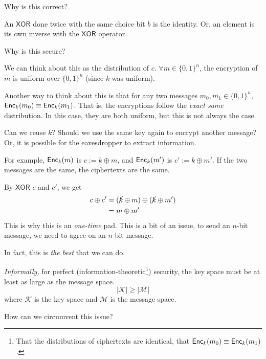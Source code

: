 \begin{ques*}
    Why is this correct?
\end{ques*}
An $\mathsf{XOR}$ done twice with the same choice bit $b$ is the identity. Or, an element is its own inverse with the $\mathsf{XOR}$ operator.

\begin{ques*}
    Why is this secure?
\end{ques*}

We can think about this as the distribution of $c$. $\forall m\in \{0, 1\}^n$, the encryption of $m$ is uniform over $\{0, 1\}^n$ (since $k$ was uniform).

Another way to think about this is that for any two messages $m_0, m_1\in\{0, 1\}^n$, $\operatorname{\mathsf{Enc}}_k(m_0)\equiv \operatorname{\mathsf{Enc}}_k(m_1)$. That is, the encryptions follow the \emph{exact same} distribution. In this case, they are both uniform, but this is not always the case.

\begin{ques*}
    Can we reuse $k$? Should we use the same key again to encrypt another message? Or, it is possible for the eavesdropper to extract information.
\end{ques*}

For example, $\operatorname{\mathsf{Enc}}_k(m)$ is $c:= k\oplus m$, and $\operatorname{\mathsf{Enc}}_k(m')$ is $c' := k\oplus m'$. If the two messages are the same, the ciphertexts are the same.

By $\mathsf{XOR}$ $c$ and $c'$, we get
\begin{align*}
    c\oplus c' & = (\cancel{k}\oplus m) \oplus (\cancel{k}\oplus m') \\
               & = m\oplus m'
\end{align*}
This is why this is an \emph{one-time} pad. This is a bit of an issue, to send an $n$-bit message, we need to agree on an $n$-bit message.

In fact, this is \emph{the best} that we can do.

\begin{theorem}
    \emph{Informally,} for perfect (information-theoretic\footnote{That the distributions of ciphertexts are identical, that $\operatorname{\mathsf{Enc}}_k(m_0)\equiv \operatorname{\mathsf{Enc}}_k(m_1)$.}) security, the key space must be at least as large as the message space.
    \[|\mathcal{K}|\geq |\mathcal{M}|\]
    where $\mathcal{K}$ is the key space and $\mathcal{M}$ is the message space.
\end{theorem}

\begin{ques*}
    How can we circumvent this issue?
\end{ques*}


